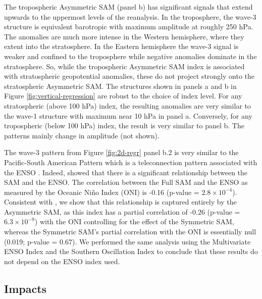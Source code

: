 \documentclass[]{ametsocV5}
\begin{document}
The tropospheric Asymmetric SAM (panel b) has significant signals that
extend upwards to the uppermost levels of the reanalysis. In the
troposphere, the wave-3 structure is equivalent barotropic with maximum
amplitude at roughly 250 hPa. The anomalies are much more intense in the
Western hemisphere, where they extent into the stratosphere. In the
Eastern hemisphere the wave-3 signal is weaker and confined to the
troposphere while negative anomalies dominate in the stratosphere. So,
while the tropospheric Asymmetric SAM index is associated with
stratospheric geopotential anomalies, these do not project strongly onto
the stratospheric Asymmetric SAM. The structures shown in panels a and b
in Figure \ref{fig:vertical-regression} are robust to the choice of
index level. For any stratospheric (above 100 hPa) index, the resulting
anomalies are very similar to the wave-1 structure with maximum near 10
hPa in panel a. Conversely, for any tropospheric (below 100 hPa) index,
the result is very similar to panel b. The patterns mainly change in
amplitude (not shown).

The wave-3 pattern from Figure \ref{fig:2d-regr} panel b.2 is very
similar to the Pacific-South American Pattern \citep{mo1987, kidson1988}
which is a teleconnection pattern associated with the ENSO
\citep{karoly1989}. Indeed, \citet{fogt2011} showed that there is a
significant relationship between the SAM and the ENSO. The correlation
between the Full SAM and the ENSO as measured by the Oceanic Niño Index
\citep{bamston1997} (ONI) is -0.16 (p-value =
\ensuremath{2.8\times 10^{-4}}). Consistent with \citet{fan2007}, we
show that this relationship is captured entirely by the Asymmetric SAM,
as this index has a partial correlation of -0.26 (p-value =
\ensuremath{6.3\times 10^{-9}}) with the ONI controlling for the effect
of the Symmetric SAM, whereas the Symmetric SAM's partial correlation
with the ONI is essentially null (0.019; p-value = 0.67). We performed
the same analysis using the Multivariate ENSO Index \citep{wolter2011}
and the Southern Oscillation Index \citep{ropelewski1987} to conclude
that these results do not depend on the ENSO index used.

\subsection{Impacts}

\label{sec:impacts}
\end{document}
